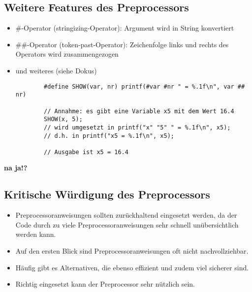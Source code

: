 \subsection{Weitere Features des Preprocessors}
\label{sec:Weitere Features des Preprocessors}
\begin{itemize}
	\item \#-Operator (stringizing-Operator): Argument wird in String konvertiert
	\item \#\#-Operator (token-past-Operator): Zeichenfolge links und rechts des Operators wird zusammengezogen
	\item und weiteres (siehe Dokus)
	\noindent
	\begin{minipage}{\linewidth}
		\begin{lstlisting}
		#define SHOW(var, nr) printf(#var #nr " = %.1f\n", var ## nr)
		
		// Annahme: es gibt eine Variable x5 mit dem Wert 16.4
		SHOW(x, 5);
		// wird umgesetzt in printf("x" "5" " = %.1f\n", x5);
		// d.h. in printf("x5 = %.1f\n", x5);
		
		// Ausgabe ist x5 = 16.4
		\end{lstlisting}
	\end{minipage}
\end{itemize}
\textbf{na ja!?}

\subsection{Kritische Würdigung des Preprocessors}
\label{sec:Kritische Würdigung des Preprocessors}
\begin{itemize}
	\item Preprocessoranweisungen sollten zurückhaltend eingesetzt werden, da der Code durch zu viele Preprocessoranweisungen sehr schnell unübersichtlich werden kann.
	\item Auf den ersten Blick sind Preprocessoranweisungen oft nicht nachvollziehbar.
	\item Häufig gibt es Alternativen, die ebenso effizient und zudem viel sicherer sind.
	\item Richtig eingesetzt kann der Preprocessor sehr nützlich sein.
\end{itemize}